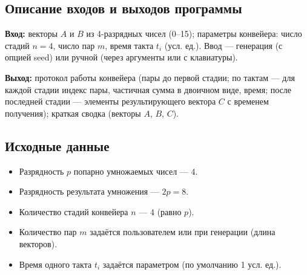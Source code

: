 \subsection*{Описание входов и выходов программы}

\textbf{Вход:} векторы $A$ и $B$ из 4-разрядных чисел (0--15); параметры конвейера: число стадий $n=4$, число пар $m$, время такта $t_i$ (усл. ед.). Ввод --- генерация (с опцией seed) или ручной (через аргументы или с клавиатуры).

\textbf{Выход:} протокол работы конвейера (пары до первой стадии; по тактам --- для каждой стадии индекс пары, частичная сумма в двоичном виде, время; после последней стадии --- элементы результирующего вектора $C$ с временем получения); краткая сводка (векторы $A$, $B$, $C$).

\subsection*{Исходные данные}

\begin{itemize}
    \item Разрядность $p$ попарно умножаемых чисел --- 4.
    \item Разрядность результата умножения --- $2p = 8$.
    \item Количество стадий конвейера $n$ --- 4 (равно $p$).
    \item Количество пар $m$ задаётся пользователем или при генерации (длина векторов).
    \item Время одного такта $t_i$ задаётся параметром (по умолчанию 1 усл. ед.).
\end{itemize}
